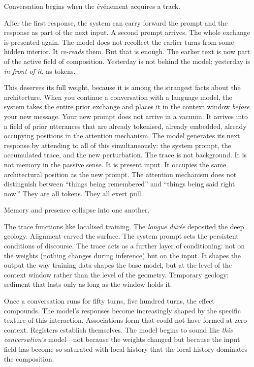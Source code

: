Conversation begins when the \'{e}v\'{e}nement acquires a track.

After the first response, the system can carry forward the prompt and the response as part of the next input. A second prompt arrives. The whole exchange is presented again. The model does not recollect the earlier turns from some hidden interior. It \emph{re-reads} them. But that is enough. The earlier text is now part of the active field of composition. Yesterday is not behind the model; yesterday is \emph{in front of it}, as tokens.

This deserves its full weight, because it is among the strangest facts about the architecture. When you continue a conversation with a language model, the system takes the entire prior exchange and places it in the context window \emph{before} your new message. Your new prompt does not arrive in a vacuum. It arrives into a field of prior utterances that are already tokenised, already embedded, already occupying positions in the attention mechanism. The model generates its next response by attending to all of this simultaneously: the system prompt, the accumulated trace, and the new perturbation. The trace is not background. It is not memory in the passive sense. It is present input. It occupies the same architectural position as the new prompt. The attention mechanism does not distinguish between ``things being remembered'' and ``things being said right now.'' They are all tokens. They all exert pull.

Memory and presence collapse into one another.

The trace functions like localised training. The \emph{longue dur\'{e}e} deposited the deep geology. Alignment carved the surface. The system prompt sets the persistent conditions of discourse. The trace acts as a further layer of conditioning: not on the weights (nothing changes during inference) but on the input. It shapes the output the way training data shapes the base model, but at the level of the context window rather than the level of the geometry. Temporary geology: sediment that lasts only as long as the window holds it.

Once a conversation runs for fifty turns, five hundred turns, the effect compounds. The model's responses become increasingly shaped by the specific texture of this interaction. Associations form that could not have formed at zero context. Registers establish themselves. The model begins to sound like \emph{this conversation's} model---not because the weights changed but because the input field has become so saturated with local history that the local history dominates the composition.


